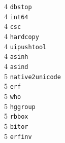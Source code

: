 \begin{footnotesize}
\begin{multicols}{3}
\vspace{-.153cm} 4     \hspace{.2cm} {\tt dbstop              }   \\ %
\vspace{-.153cm} 4     \hspace{.2cm} {\tt int64               }   \\ %
\vspace{-.153cm} 4     \hspace{.2cm} {\tt csc                 }   \\ %
\vspace{-.153cm} 4     \hspace{.2cm} {\tt hardcopy            }   \\ %
\vspace{-.153cm} 4     \hspace{.2cm} {\tt uipushtool          }   \\ %
\vspace{-.153cm} 4     \hspace{.2cm} {\tt asinh               }   \\ %
\vspace{-.153cm} 4     \hspace{.2cm} {\tt asind               }   \\ %
\vspace{-.153cm} 5     \hspace{.2cm} {\tt native2unicode      }   \\ %
\vspace{-.153cm} 5     \hspace{.2cm} {\tt erf                 }   \\ %
\vspace{-.153cm} 5     \hspace{.2cm} {\tt who                 }   \\ %
\vspace{-.153cm} 5     \hspace{.2cm} {\tt hggroup             }   \\ %
\vspace{-.153cm} 5     \hspace{.2cm} {\tt rbbox               }   \\ %
\vspace{-.153cm} 5     \hspace{.2cm} {\tt bitor               }   \\ %
\vspace{-.153cm} 5     \hspace{.2cm} {\tt erfinv              }   \\ %

\end{multicols}
\end{footnotesize}
